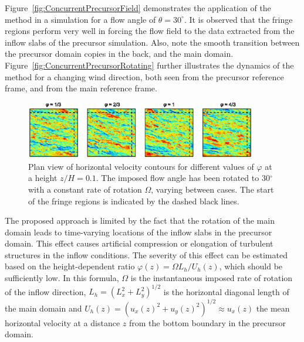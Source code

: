 	\clearpage
	Figure~\ref{fig:ConcurrentPrecursorField} demonstrates the application of the method in a simulation for a flow angle of $\theta = 30^\circ$. It is observed that the fringe regions perform very well in forcing the flow field to the data extracted from the inflow slabs of the precursor simulation. Also, note the smooth transition between the precursor domain copies in the back, and the main domain.
	Figure~\ref{fig:ConcurrentPrecursorRotating} further illustrates the dynamics of the method for a changing wind direction, both seen from the precursor reference frame, and from the main reference frame.

	\begin{figure}[tb!]
					\centering
		\includegraphics[width=0.9\textwidth]{chapters/turbulent_inflow/blm/figure8.eps}
		\caption[Plan view of horizontal velocity contours for different values of $\varphi$ at a height $z/H = 0.1$.]{Plan view of horizontal velocity contours for different values of $\varphi$ at a height $z/H = 0.1$. The imposed flow angle has been rotated to 30$^\circ$ with a constant rate of rotation $\Omega$, varying between cases. The start of the fringe regions is indicated by the dashed black lines.}
		\label{fig:rotationrate}
	\end{figure}
	
	
	The proposed approach is limited by the fact that the rotation of the main domain leads to time-varying locations of the inflow slabs in the precursor domain. This effect causes artificial compression or elongation of turbulent structures in the inflow conditions. The severity of this effect can be estimated based on the height-dependent ratio $\varphi(z) = \Omega L_h/ U_h(z) $, which should be sufficiently low. In this formula, $\Omega$ is the instantaneous imposed rate of rotation of the inflow direction, $L_h = (L_x^2 + L_y^2)^{1/2}$ is the horizontal diagonal length of the main domain and $U_h(z) = (u_x(z)^2 + u_y(z)^2)^{1/2} \approx u_x(z)$ the mean horizontal velocity at a distance $z$ from the bottom boundary in the precursor domain.
	
